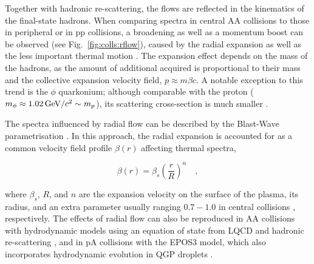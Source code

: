Together with hadronic re-scattering, the flows are reflected in the kinematics of the final-state hadrons. When comparing \pt spectra in central AA collisions to those in peripheral or in pp collisions, a broadening as well as a momentum boost can be observed (see Fig.~\ref{fig:colls:rflow}), caused by the radial expansion as well as the less important thermal motion \cite{alicecollaborationCentralityDependenceRm2013, alicecollaborationRmSRm2013, alicecollaboration8920Phi2015}. The expansion effect depends on the mass of the hadrons, as the amount of additional \pt acquired is proportional to their mass and the collective expansion velocity field, $p \approx m\beta c$. A notable exception to this trend is the $\phi$ quarkonium; although comparable with the proton ($m_\phi \approx 1.02 \text{\,GeV/$c^2$} \sim m_p$), its scattering cross-section is much smaller \cite{hungEquationStateRadial1998}.

The \pt spectra influenced by radial flow can be described by the Blast-Wave parametrisation \cite{schnedermannThermalPhenomenologyHadrons1993}. In this approach, the radial expansion is accounted for as a common velocity field profile $\beta (r)$ affecting thermal spectra, 

\begin{minipage}{0.5\linewidth}
    \begin{center}
    \end{center}
\end{minipage}%
\begin{minipage}{0.5\linewidth}
    \begin{equation}
		\beta (r) = \beta_s (\frac{r}{R})^n \quad ,
    \end{equation}
\end{minipage}

where $\beta_s$, $R$, and $n$ are the expansion velocity on the surface of the plasma, its radius, and an extra parameter usually ranging $0.7-1.0$ in central collisions \cite{alicecollaborationCentralityDependenceRm2013}, respectively. The effects of radial flow can also be reproduced in AA collisions with hydrodynamic models using an equation of state from LQCD and hadronic re-scattering \cite{hungEquationStateRadial1998}, and in pA collisions with the EPOS3 model, which also incorporates hydrodynamic evolution in QGP droplets \cite{wernerAnalysingRadialFlow2014}.

